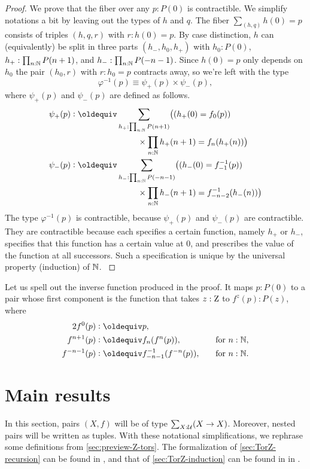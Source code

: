 \documentclass[a4paper,12pt]{amsart}
\begin{document}
\begin{proof}
  We prove that the fiber over any $p : P(0)$ is contractible.
  We simplify notations a bit by leaving out the types of $h$ and $q$.
  The fiber $\sum_{(h,q)} h(0)=p$ consists of triples $(h,q,r)$ with $r : h(0) = p$.
  By case distinction, $h$ can (equivalently) be split in three parts $(h_-,h_0,h_+)$
  with $h_0 : P(0)$, $h_+ : \prod_{n:\mathbb{N}}P(n+1)$,  and $h_- : \prod_{n:\mathbb{N}} P(-n-1)$.
  Since $h(0)=p$ only depends on $h_0$ the pair $(h_0,r)$ with  $r : h_0 = p$
  contracts away, so we're left with the type
  $$ \varphi^{-1}(p) \equiv \psi_+(p) \times \psi_-(p), $$
  \bgroup
  where $\psi_+(p)$ and $\psi_-(p)$ are defined as follows.
  \begin{align*}
    \psi_+(p) & \defeq  \sum_{h_+ : \prod_{n:\NN}P(n+1)}  \bigl((h_+(0) = f_0(p))         \\
    & \hspace {8em} \times \prod_{n:\NN}h_+(n+1) = f_n(h_+(n))\bigr) \\
    \psi_-(p) & \defeq  \sum_{h_- : \prod_{n:\NN}P(-n-1)} \bigl((h_-(0) = f_{-1}^{-1}(p))  \\
    & \hspace {8em} \times \prod_{n:\NN}h_-(n+1) = f_{-n-2}^{-1}(h_-(n))\bigr)
  \end{align*}
  The type $\varphi^{-1}(p)$ is contractible, because $\psi_+(p)$ and $\psi_-(p)$ are contractible.
  They are contractible because each specifies a certain function, namely $h_+$ or $h_-$,
  specifies that this function has a certain value at $0$,
  and prescribes the value of the function at all successors.
  Such a specification is unique by the universal property (induction) of $\mathbb{N}$.
  \egroup
\end{proof}

Let us spell out the inverse function produced in the proof.
It maps $p : P(0)$ to a pair whose first component
is the function that takes $z:\mathrm{Z}$ to $f^z(p):P(z)$, where
\begin{alignat*}2
  f^0(p) &\defeq p, && \\
  f^{n+1}(p) &\defeq f_n(f^n(p)),&\quad&\text{for $n:\NN$,} \\
  f^{-n-1}(p) &\defeq f_{-n-1}^{-1}(f^{-n}(p)),&\quad&\text{for $n:\NN$.}
\end{alignat*}

\section{Main results}\label{sec:ZTorsors}

In this section, pairs $(X,f)$ will be of type $\sum_{X:\mathcal{U}}(X\to X)$.
Moreover, nested pairs will be written as tuples.
With these notational simplifications, we rephrase some definitions from
\cref{sec:preview-Z-tors}.
The formalization of \cref{sec:TorZ-recursion} can be found in \cite{circlerec-Dan},
and that of \cref{sec:TorZ-induction} can be found in in \cite{circleind-Dan}.
\end{document}
